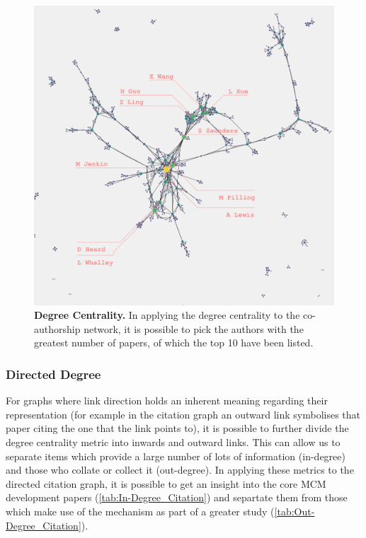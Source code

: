 \begin{figure}[H]
     \centering
         \includegraphics[width=.8\textwidth]{figures_c3/degreeauthor.png}
         
        \caption{ \textbf{Degree Centrality.} In applying the degree centrality to the co-authorship network, it is possible to pick the authors with the greatest number of papers, of which the top 10 have been listed.}
        \label{fig:degauth}
\end{figure}

% 
% 

\subsubsection*{Directed Degree}
For graphs where link direction holds an inherent meaning regarding their representation (for example in the citation graph an outward link symbolises that paper citing the one that the link points to), it is possible to further divide the degree centrality metric into inwards and outward links. This can allow us to separate items which provide a large number of lots of information (in-degree) and those who collate or collect it (out-degree). In applying these metrics to the directed citation graph, it is possible to get an insight into the core MCM development papers (\autoref{tab:In-Degree_Citation}) and separtate them from those which make use of the mechanism as part of a greater study (\autoref{tab:Out-Degree_Citation}).



